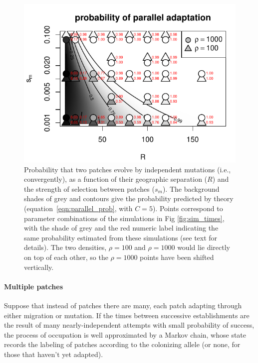 \documentclass{article}
\begin{document}
\begin{figure}[ht!]
  \begin{center}
      \includegraphics{prob-mutation-compared}
  \end{center}
  \caption{
      Probability that two patches 
      evolve by independent mutations (i.e., convergently),
      as a function of their geographic separation ($R$)
      and the strength of selection between patches ($s_m$).
      The background shades of grey and contours
      give the probability predicted by theory (equation~\eqref{eqn:parallel_prob}, with $C=5$).
      Points correspond to parameter combinations of the simulations in Fig \ref{fig:sim_times},
      with the shade of grey and the red numeric label indicating the same probability
      estimated from these simulations (see text for details).
      The two densities, $\rho=100$ and $\rho=1000$ would lie directly on top of each other, so the $\rho=1000$ points have been shifted vertically.
  }   \label{fig:sim_probs}
\end{figure}


\paragraph{Multiple patches}

Suppose that instead of patches there are many,
each patch adapting through either migration or mutation.
If the times between successive establishments are the result of many nearly-independent attempts
with small probability of success,
the process of occupation is well approximated by a Markov chain,
whose state records the labeling of patches according to the colonizing allele
(or none, for those that haven't yet adapted).
\end{document}
